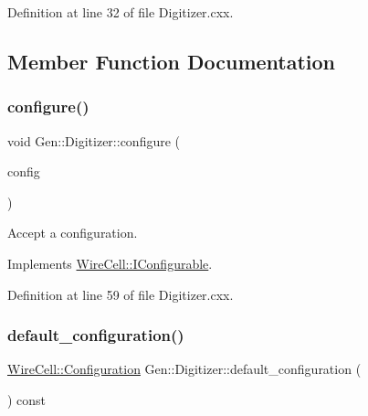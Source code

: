 Definition at line 32 of file Digitizer.\+cxx.



\subsection{Member Function Documentation}
\mbox{\label{class_wire_cell_1_1_gen_1_1_digitizer_aca2a5cb3a51bcb3fb147456f3542babe}} 
\subsubsection{\texorpdfstring{configure()}{configure()}}
{\footnotesize\ttfamily void Gen\+::\+Digitizer\+::configure (\begin{DoxyParamCaption}\item[{const \hyperlink{namespace_wire_cell_a9f705541fc1d46c608b3d32c182333ee}{Wire\+Cell\+::\+Configuration} \&}]{config }\end{DoxyParamCaption})\hspace{0.3cm}{\ttfamily [virtual]}}



Accept a configuration. 



Implements \hyperlink{class_wire_cell_1_1_i_configurable_a57ff687923a724093df3de59c6ff237d}{Wire\+Cell\+::\+I\+Configurable}.



Definition at line 59 of file Digitizer.\+cxx.

\mbox{\label{class_wire_cell_1_1_gen_1_1_digitizer_a6f8c0cf139021b7b54162e1dc42d9668}} 
\subsubsection{\texorpdfstring{default\+\_\+configuration()}{default\_configuration()}}
{\footnotesize\ttfamily \hyperlink{namespace_wire_cell_a9f705541fc1d46c608b3d32c182333ee}{Wire\+Cell\+::\+Configuration} Gen\+::\+Digitizer\+::default\+\_\+configuration (\begin{DoxyParamCaption}{ }\end{DoxyParamCaption}) const\hspace{0.3cm}{\ttfamily [virtual]}}



